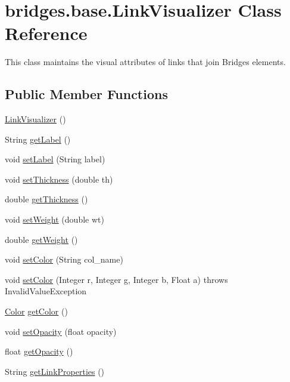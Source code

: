 \hypertarget{classbridges_1_1base_1_1_link_visualizer}{}\section{bridges.\+base.\+Link\+Visualizer Class Reference}
\label{classbridges_1_1base_1_1_link_visualizer}


This class maintains the visual attributes of links that join Bridges elements.  


\subsection*{Public Member Functions}
\begin{DoxyCompactItemize}
\item 
\hyperlink{classbridges_1_1base_1_1_link_visualizer_a0b69f099fa264ae9097b0efe278c6a1b}{Link\+Visualizer} ()
\item 
String \hyperlink{classbridges_1_1base_1_1_link_visualizer_a9ed60a0f8a337cd2c98b2d6ab07b8601}{get\+Label} ()
\item 
void \hyperlink{classbridges_1_1base_1_1_link_visualizer_a073d84e04dd95c3848c9f4e0ad74eb77}{set\+Label} (String label)
\item 
void \hyperlink{classbridges_1_1base_1_1_link_visualizer_a702e9ca345d1a4a035baf2041f275849}{set\+Thickness} (double th)
\item 
double \hyperlink{classbridges_1_1base_1_1_link_visualizer_af1592d2a8664b00c1a51fdc0f8d1860a}{get\+Thickness} ()
\item 
void \hyperlink{classbridges_1_1base_1_1_link_visualizer_a21d5884d243cf5a08f9d544f5083a44c}{set\+Weight} (double wt)
\item 
double \hyperlink{classbridges_1_1base_1_1_link_visualizer_ac96d7fb118ae6c7e1bdd57c5e2c8639a}{get\+Weight} ()
\item 
void \hyperlink{classbridges_1_1base_1_1_link_visualizer_a92f306dbd73b961befa8ab4c0620a89e}{set\+Color} (String col\+\_\+name)
\item 
void \hyperlink{classbridges_1_1base_1_1_link_visualizer_a003905cfe33e1704555b2b3a1cf99bad}{set\+Color} (Integer r, Integer g, Integer b, Float a)  throws Invalid\+Value\+Exception 
\item 
\hyperlink{classbridges_1_1base_1_1_color}{Color} \hyperlink{classbridges_1_1base_1_1_link_visualizer_a3ed52d98ecab99c6d8dd136fba913b7d}{get\+Color} ()
\item 
void \hyperlink{classbridges_1_1base_1_1_link_visualizer_ac0d59614dbc65ed0a19c25c493a1deaa}{set\+Opacity} (float opacity)
\item 
float \hyperlink{classbridges_1_1base_1_1_link_visualizer_a07cdd435a54e4b612ad63614f2a27a4a}{get\+Opacity} ()
\item 
String \hyperlink{classbridges_1_1base_1_1_link_visualizer_ab64d9b7e2b99f7ebce80cbabfe4adf2a}{get\+Link\+Properties} ()
\end{DoxyCompactItemize}


